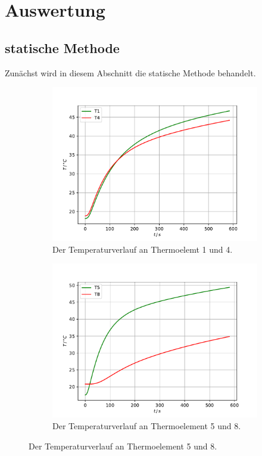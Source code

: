 \section{Auswertung}
\label{sec:Auswertung}

\subsection{statische Methode}
Zunächst wird in diesem Abschnitt die statische Methode behandelt.

\begin{figure}
    \centering
    \caption{Vier Temperaturverläufe von unterschiedlichen Materialien.}
    \begin{subfigure}{\textwidth/2}
        \centering
        \includegraphics[width=\textwidth]{content/data/statsisch_T1_T4.pdf}
        \caption{Der Temperaturverlauf an Thermoelemt 1 und 4.}
        \label{fig:stat_1_4}
    \end{subfigure}
    \begin{subfigure}{\textwidth/2}
        \centering
        \includegraphics[width=\textwidth]{content/data/statsisch_T5_T8.pdf}
        \caption{Der Temperaturverlauf an Thermoelement 5 und 8.}
        \label{fig:stat_5_8}
    \end{subfigure}
    \label{fig:stat}
\end{figure}

